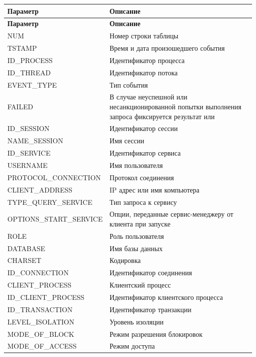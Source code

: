 \begin{longtable}[r]{|>{\ttfamily}m{4.6cm}|m{10.9cm}|}
	\hline
	\centering\normalfont\bfseries Параметр &
	\centering\arraybslash\bfseries Описание\\\hline
	\endfirsthead
	\centering\normalfont\bfseries Параметр &
	\centering\arraybslash\bfseries Описание\\\hline
	\endhead
	\hline
	NUM &  Номер строки таблицы \\\hline
	TSTAMP & Время и дата произошедшего события \\\hline
	ID\_PROCESS &  Идентификатор процесса\\\hline
	ID\_THREAD & Идентификатор потока \\\hline
	EVENT\_TYPE &  Тип события \\\hline
	FAILED &  В случае неуспешной или несанкционированной попытки выполнения запроса фиксируется результат \ttt{FAILED} или \ttt{UNAUTHORIZED}\\\hline
	ID\_SESSION & Идентификатор сессии \\\hline
	NAME\_SESSION & Имя сессии \\\hline
	ID\_SERVICE & Идентификатор сервиса \\\hline
	USERNAME & Имя пользователя \\\hline
	PROTOCOL\_CONNECTION & Протокол соединения \\\hline
	CLIENT\_ADDRESS & IP адрес или имя компьютера \\\hline
	TYPE\_QUERY\_SERVICE & Тип запроса к сервису \\\hline
	OPTIONS\_START\_SERVICE &  Опции, переданные сервис-менеджеру от клиента при запуске \\\hline
	ROLE & Роль пользователя \\\hline
	DATABASE & Имя базы данных \\\hline
	CHARSET & Кодировка \\\hline
	ID\_CONNECTION &  Идентификатор соединения \\\hline
	CLIENT\_PROCESS & Клиентский процесс \\\hline
	ID\_CLIENT\_PROCESS & Идентификатор клиентского процесса \\\hline
	ID\_TRANSACTION &  Идентификатор транзакции \\\hline
	LEVEL\_ISOLATION & Уровень изоляции \\\hline
	MODE\_OF\_BLOCK &  Режим разрешения блокировок \\\hline
	MODE\_OF\_ACCESS & Режим доступа \\\hline

\end{longtable}
